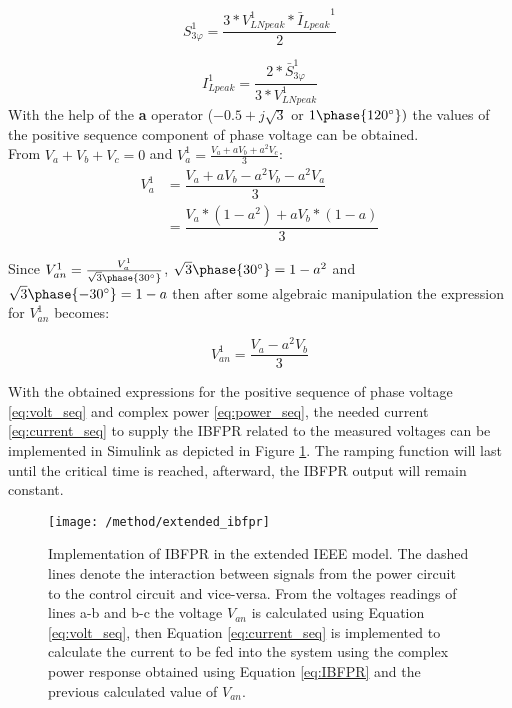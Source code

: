 \begin{equation}
\label{eq:power_seq}
S_{3\varphi}^1=\dfrac{3*V_{LNpeak}^1*{\bar I_{Lpeak}}^1}{2}
\end{equation}


\begin{equation}
\label{eq:current_seq}
I_{Lpeak}^1=\dfrac{2*\bar{S}_{3\varphi}^1}{3*V_{LNpeak}^1}
\end{equation}
With the help of the \textbf{a} operator ($-0.5+j\sqrt{3}$ or $ 1\phase{120^{\circ}}) $ the values of the positive sequence component of phase voltage can be obtained. \\
From $ V_a +V_b+V_c=0$ and $ V_a^1=\frac{V_a+ aV_b+a^2 V_c}{3} $:
\begin{align*}
V_a^1 & =\dfrac{V_a+ aV_b-a^2 V_b-a^2V_a}{3} \\
& =\dfrac{V_a*(1-a^2)+ aV_b*(1-a)}{3}
\end{align*}

Since $V_{an}^1=\frac{V_a^1}{\sqrt{3}\phase{30^{\circ}}}$, $\sqrt{3}\phase{30^{\circ}}=1-a^2 $ and $ \sqrt{3}\phase{-30^{\circ}}=1-a $ then after some algebraic manipulation the expression for $ V_{an}^1 $ becomes:

\begin{equation}
\label{eq:volt_seq}
V_{an}^1=\dfrac{V_a-a^2 V_b}{3}
\end{equation}

With the obtained expressions for the positive sequence of phase voltage \eqref{eq:volt_seq} and complex power \eqref{eq:power_seq}, the needed current \eqref{eq:current_seq} to supply the IBFPR related to the measured voltages can be implemented in Simulink as depicted in Figure \ref{fig:ieeeext_ibfpr}. The ramping function will last until the critical time is reached, afterward, the IBFPR output will remain constant.

\begin{figure}[h]
\centering
\texttt{[image: /method/extended\_ibfpr]}
\caption{Implementation of IBFPR in the extended IEEE model. The dashed lines denote the interaction between signals from the power circuit to the control circuit and vice-versa. From the voltages readings of lines a-b and b-c the voltage $ V_{an} $ is calculated using Equation \eqref{eq:volt_seq}, then Equation \eqref{eq:current_seq} is implemented to calculate the current to be fed into the system using the complex power response obtained using Equation \eqref{eq:IBFPR} and the previous calculated value of $ V_{an} $.}
\label{fig:ieeeext_ibfpr}
\end{figure}

